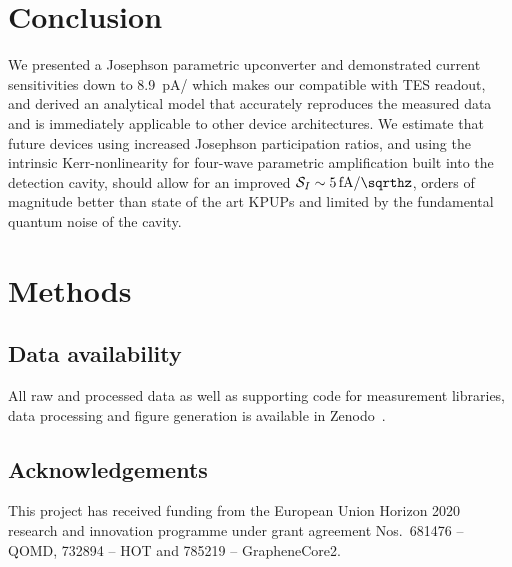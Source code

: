 \section{Conclusion}

We presented a Josephson parametric upconverter and demonstrated current sensitivities down to \SI{8.9}{\pico\ampere/\sqrthz} which makes our compatible with TES readout, and derived an analytical model that accurately reproduces the measured data and is immediately applicable to other device architectures.
% 
We estimate that future devices using increased Josephson participation ratios, and using the intrinsic Kerr-nonlinearity for four-wave parametric amplification built into the detection cavity, should allow for an improved $\mathcal{S}_I\sim\SI{5}{\femto\ampere/\sqrthz}$, orders of magnitude better than state of the art KPUPs and limited by the fundamental quantum noise of the cavity.



\section{Methods}
\subsection{Data availability}
All raw and processed data as well as supporting code for measurement libraries, data processing and figure generation is available in Zenodo~\cite{schmidtDataProcessingCurrent2020}.

\subsection{Acknowledgements}
This project has received funding from the European Union Horizon 2020 research and innovation programme under grant agreement Nos.~681476 -- QOMD, 732894 -- HOT and 785219 -- GrapheneCore2.

